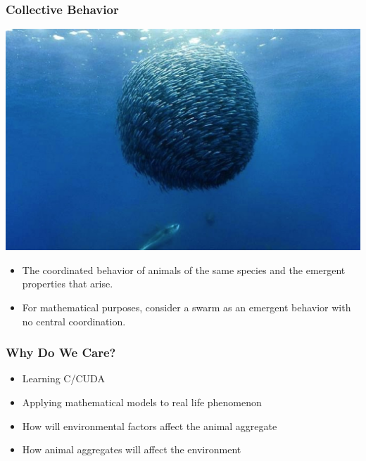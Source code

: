 \documentclass[xcolor=dvipsnames]{beamer}
\begin{document}
\begin{frame}
	\frametitle{Collective Behavior}
	\begin{center}
	\includegraphics[scale=0.05]{images/fish_schoo.jpg}
	\end{center}
	\begin{itemize}
		\item The coordinated behavior of animals of the same species and the emergent properties that arise.
		\pause
		\item For mathematical purposes, consider a swarm as an emergent behavior with no central coordination.
	\end{itemize}
\end{frame}

\begin{frame}
	\frametitle{Why Do We Care?}
	\begin{itemize}
			\item Learning C/CUDA
			\item Applying mathematical models to real life phenomenon
			\item How will environmental factors affect the animal aggregate
			\item How animal aggregates will affect the environment 
	\end{itemize}
\end{frame}
\end{document}
